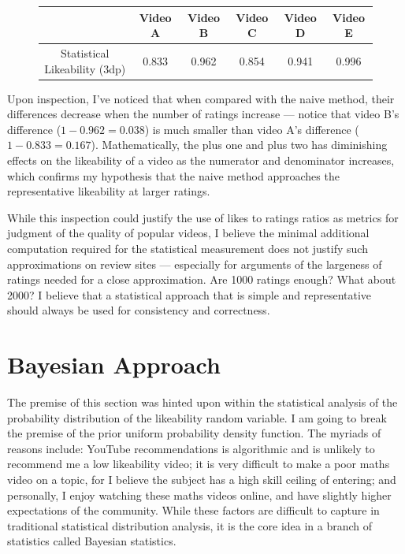 \documentclass[a4paper,11pt]{article}
\begin{document}
\begin{figure}[H]
    \centering
    \begin{tabular}{c|c|c|c|c|c}
        & Video A & Video B & Video C & Video D & Video E \\
        \hline
        \hline
        Statistical Likeability (3dp) & 0.833 & 0.962 & 0.854 & 0.941 & 0.996
    \end{tabular}
    \label{tbl:stat}
\end{figure}

Upon inspection, I've noticed that when compared with the naive method, their differences decrease when the number of ratings increase --- notice that video B's difference ($1-0.962 = 0.038$) is much smaller than video A's difference ($1-0.833= 0.167$). Mathematically, the plus one and plus two has diminishing effects on the likeability of a video as the numerator and denominator increases, which confirms my hypothesis that the naive method approaches the representative likeability at larger ratings.

While this inspection could justify the use of likes to ratings ratios as metrics for judgment of the quality of popular videos, I believe the minimal additional computation required for the statistical measurement does not justify such approximations on review sites --- especially for arguments of the largeness of ratings needed for a close approximation. Are 1000 ratings enough? What about 2000? I believe that a statistical approach that is simple and representative should always be used for consistency and correctness.

\section{Bayesian Approach}
The premise of this section was hinted upon within the statistical analysis of the probability distribution of the likeability random variable. I am going to break the premise of the prior uniform probability density function. The myriads of reasons include: YouTube recommendations is algorithmic and is unlikely to recommend me a low likeability video; it is very difficult to make a poor maths video on a topic, for I believe the subject has a high skill ceiling of entering; and personally, I enjoy watching these maths videos online, and have slightly higher expectations of the community. While these factors are difficult to capture in traditional statistical distribution analysis, it is the core idea in a branch of statistics called Bayesian statistics.
\end{document}
